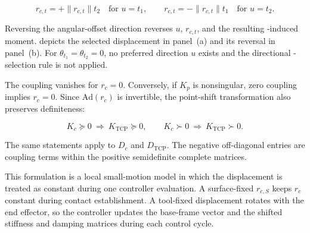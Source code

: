 \begin{equation}
r_{c,t}=+\lVert r_{c,t}\rVert t_2
\quad\text{for }u=t_1,
\qquad
r_{c,t}=-\lVert r_{c,t}\rVert t_1
\quad\text{for }u=t_2.
\label{eq:principal_lever_selection}
\end{equation}

Reversing the angular-offset direction reverses \mbox{\(u\)},
\mbox{\(r_{c,t}\)}, and the resulting -induced moment.
\mbox{} depicts the selected displacement in
panel~(a) and its reversal in panel~(b). For
\mbox{\(\theta_{t_1}=\theta_{t_2}=0\)}, no preferred direction \mbox{\(u\)}
exists and the directional -selection rule is not applied.

\begin{figure}[H]
  \centering
  
  \caption[Normal-force contribution for opposite tangential displacements]{
  }
  \label{fig:compliance_lever_moment}
\end{figure}


The coupling vanishes for \mbox{\(r_c=0\)}. Conversely, if \mbox{\(K_p\)} is
nonsingular, zero coupling implies \mbox{\(r_c=0\)}. Since
\mbox{\(\mathrm{Ad}(r_c)\)} is invertible, the point-shift transformation also
preserves definiteness:

\begin{equation}
K_c\succeq0
\ \Longrightarrow\
K_{\mathrm{TCP}}\succeq0,
\qquad
K_c\succ0
\ \Longrightarrow\
K_{\mathrm{TCP}}\succ0.
\label{eq:pole_gain_definiteness}
\end{equation}

The same statements apply to \mbox{\(D_c\)} and \mbox{\(D_{\mathrm{TCP}}\)}.
The negative off-diagonal entries are coupling terms within the positive
semidefinite complete matrices.

This formulation is a local small-motion model in which the displacement is
treated as constant during one controller evaluation. A surface-fixed
\mbox{\(r_{c,S}\)} keeps \mbox{\(r_c\)} constant during contact
establishment. A tool-fixed displacement rotates with the end effector, so the
controller updates the base-frame vector and the shifted stiffness and damping
matrices during each control cycle.

